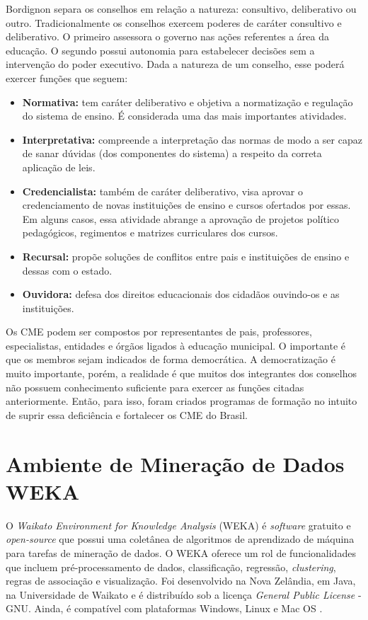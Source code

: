 \documentclass[tg]{mdtufsm}
\begin{document}
Bordignon \citeyearpar{bordignon2009} separa os conselhos em relação a natureza: consultivo, deliberativo ou outro. Tradicionalmente os conselhos exercem poderes de caráter consultivo e deliberativo. O primeiro assessora o governo nas ações referentes a área da educação. O segundo possui autonomia para estabelecer decisões sem a intervenção do poder executivo. Dada a natureza de um conselho, esse poderá exercer funções que seguem:

\begin{itemize}
	\item \textbf{Normativa:} tem caráter deliberativo e objetiva a normatização e regulação do sistema de ensino. É considerada uma das mais importantes atividades.
	\item \textbf{Interpretativa:} compreende a interpretação das normas de modo a ser capaz de sanar dúvidas (dos componentes do sistema) a respeito da correta aplicação de leis.
	\item \textbf{Credencialista:} também de caráter deliberativo, visa aprovar o credenciamento de novas instituições de ensino e cursos ofertados por essas. Em alguns casos, essa atividade abrange a aprovação de projetos político pedagógicos, regimentos e matrizes curriculares dos cursos.
	\item \textbf{Recursal:} propõe soluções de conflitos entre pais e instituições de ensino e dessas com o estado. 
	\item \textbf{Ouvidora:} defesa dos direitos educacionais dos cidadãos ouvindo-os e as instituições.
\end{itemize}

Os CME podem ser compostos por representantes de pais, professores, especialistas, entidades e órgãos ligados à educação municipal. O importante é que os membros sejam indicados de forma democrática. A democratização é muito importante, porém, a realidade é que muitos dos integrantes dos conselhos não possuem conhecimento suficiente para exercer as funções citadas anteriormente. Então, para isso, foram criados programas de formação no intuito de suprir essa deficiência e fortalecer os CME do Brasil.  \cite{cartilhaCruz}

\section{Ambiente de Mineração de Dados WEKA}

O \textit{Waikato Environment for Knowledge Analysis} (WEKA) é \textit{software} gratuito e \textit{open-source} que possui uma coletânea de algoritmos de aprendizado de máquina para tarefas de mineração de dados. O WEKA oferece um rol de funcionalidades que incluem pré-processamento de dados, classificação, regressão, \textit{clustering}, regras de associação e visualização. Foi desenvolvido na Nova Zelândia, em Java, na Universidade de Waikato e é distribuído sob a licença \textit{General Public License} - GNU. Ainda, é compatível com plataformas Windows, Linux e Mac OS \cite{weka}.
\end{document}
